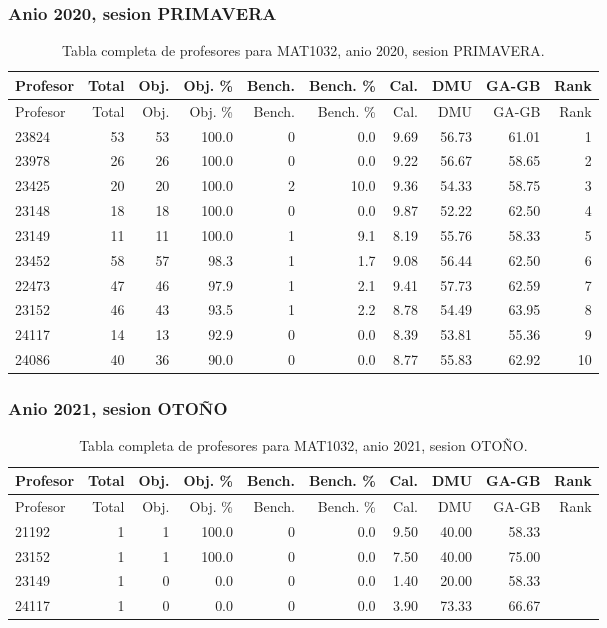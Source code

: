 \subsubsection{Anio 2020, sesion PRIMAVERA}

\begingroup
\scriptsize
\setlength{\tabcolsep}{3pt}
\begin{longtable}{lrrrrrrrrr}
\caption{Tabla completa de profesores para MAT1032, anio 2020, sesion PRIMAVERA.}\label{tab:prof-period-mat1032-2020-primavera}\\
\toprule
Profesor & Total & Obj. & Obj. \% & Bench. & Bench. \% & Cal. & DMU & GA-GB & Rank \\
\midrule
\endfirsthead
\toprule
Profesor & Total & Obj. & Obj. \% & Bench. & Bench. \% & Cal. & DMU & GA-GB & Rank \\
\midrule
\endhead
23824 & 53 & 53 & 100.0 & 0 & 0.0 & 9.69 & 56.73 & 61.01 & 1 \\
23978 & 26 & 26 & 100.0 & 0 & 0.0 & 9.22 & 56.67 & 58.65 & 2 \\
23425 & 20 & 20 & 100.0 & 2 & 10.0 & 9.36 & 54.33 & 58.75 & 3 \\
23148 & 18 & 18 & 100.0 & 0 & 0.0 & 9.87 & 52.22 & 62.50 & 4 \\
23149 & 11 & 11 & 100.0 & 1 & 9.1 & 8.19 & 55.76 & 58.33 & 5 \\
23452 & 58 & 57 & 98.3 & 1 & 1.7 & 9.08 & 56.44 & 62.50 & 6 \\
22473 & 47 & 46 & 97.9 & 1 & 2.1 & 9.41 & 57.73 & 62.59 & 7 \\
23152 & 46 & 43 & 93.5 & 1 & 2.2 & 8.78 & 54.49 & 63.95 & 8 \\
24117 & 14 & 13 & 92.9 & 0 & 0.0 & 8.39 & 53.81 & 55.36 & 9 \\
24086 & 40 & 36 & 90.0 & 0 & 0.0 & 8.77 & 55.83 & 62.92 & 10 \\
\bottomrule
\end{longtable}
\endgroup

\subsubsection{Anio 2021, sesion OTOÑO}

\begingroup
\scriptsize
\setlength{\tabcolsep}{3pt}
\begin{longtable}{lrrrrrrrrr}
\caption{Tabla completa de profesores para MAT1032, anio 2021, sesion OTOÑO.}\label{tab:prof-period-mat1032-2021-oto-o}\\
\toprule
Profesor & Total & Obj. & Obj. \% & Bench. & Bench. \% & Cal. & DMU & GA-GB & Rank \\
\midrule
\endfirsthead
\toprule
Profesor & Total & Obj. & Obj. \% & Bench. & Bench. \% & Cal. & DMU & GA-GB & Rank \\
\midrule
\endhead
21192 & 1 & 1 & 100.0 & 0 & 0.0 & 9.50 & 40.00 & 58.33 &  \\
23152 & 1 & 1 & 100.0 & 0 & 0.0 & 7.50 & 40.00 & 75.00 &  \\
23149 & 1 & 0 & 0.0 & 0 & 0.0 & 1.40 & 20.00 & 58.33 &  \\
24117 & 1 & 0 & 0.0 & 0 & 0.0 & 3.90 & 73.33 & 66.67 &  \\
\bottomrule
\end{longtable}
\endgroup


